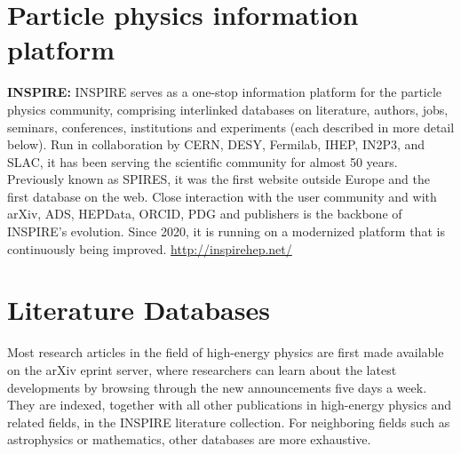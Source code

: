 \section{Particle physics information
platform}\label{databases:sec:platforms}


  \textbf{INSPIRE:} INSPIRE serves as a one-stop information platform
  for the particle physics community, comprising interlinked databases
  on literature, authors, jobs, seminars, conferences, institutions and
  experiments (each described in more detail below). Run in collaboration by CERN, DESY,
  Fermilab, IHEP, IN2P3, and SLAC, it has been serving the scientific
  community for almost 50 years. Previously known as SPIRES, it was the
  first website outside Europe and the first database on the web. Close
  interaction with the user community and with arXiv, ADS, HEPData,
  ORCID, PDG and publishers is the backbone of INSPIRE's evolution.
  Since 2020, it is running on a modernized platform that is continuously being improved.
  \url{http://inspirehep.net/}

\section{Literature Databases}\label{databases:sec:literature}


Most research articles in the field of high-energy physics are first made
available on the arXiv eprint server, where researchers can learn about the
latest developments by browsing through the new announcements 
five days a week. They are indexed, together with all other publications in
high-energy physics and related fields, in the INSPIRE literature collection.
For neighboring fields such as astrophysics or mathematics, other databases are
more exhaustive.

